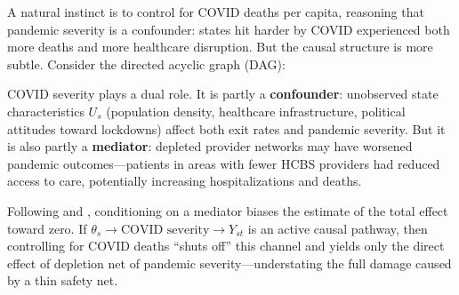 \documentclass[12pt]{article}
\begin{document}
A natural instinct is to control for COVID deaths per capita, reasoning that pandemic severity is a confounder: states hit harder by COVID experienced both more deaths and more healthcare disruption. But the causal structure is more subtle. Consider the directed acyclic graph (DAG):

\begin{center}
\end{center}

COVID severity plays a dual role. It is partly a \textbf{confounder}: unobserved state characteristics $U_s$ (population density, healthcare infrastructure, political attitudes toward lockdowns) affect both exit rates and pandemic severity. But it is also partly a \textbf{mediator}: depleted provider networks may have worsened pandemic outcomes---patients in areas with fewer HCBS providers had reduced access to care, potentially increasing hospitalizations and deaths.

Following \citet{angrist2009} and \citet{pearl2009}, conditioning on a mediator biases the estimate of the total effect toward zero. If $\theta_s \to \text{COVID severity} \to Y_{st}$ is an active causal pathway, then controlling for COVID deaths ``shuts off'' this channel and yields only the direct effect of depletion net of pandemic severity---understating the full damage caused by a thin safety net.
\end{document}
